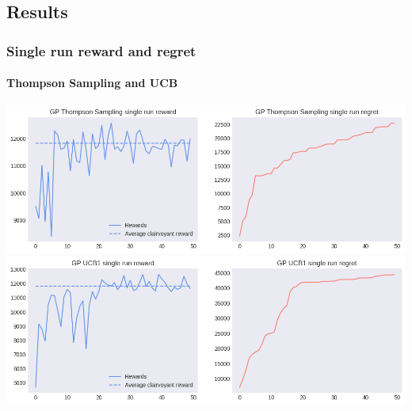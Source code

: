 
\subsection{Results}


\begin{frame}[plain]

\frametitle{Single run reward and regret}
\framesubtitle{Thompson Sampling and UCB}

\begin{center}
	\hspace*{-1em}
	\includegraphics[scale=0.42]{img/Graphs/uncertain_alpha/image1.png}
	\hspace*{-1em}
	\includegraphics[scale=0.42]{img/Graphs/uncertain_alpha/image2.png}
\end{center}

\end{frame}


